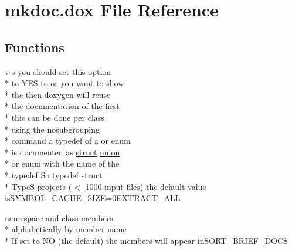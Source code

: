 \hypertarget{mkdoc_8dox}{\section{mkdoc.\-dox File Reference}
\label{mkdoc_8dox}
}
\subsection*{Functions}
\begin{DoxyCompactItemize}
\item 
v s you should set this option \\*
to Y\-E\-S to or you want to show \\*
the then doxygen will reuse \\*
the documentation of the first \\*
this can be done per class \\*
using the nosubgrouping \\*
command a typedef of a or enum \\*
is documented as \hyperlink{mkdoc_8dox_aba655c5729da86df745f0c8e7f9ba8d2}{struct} \hyperlink{mkdoc_8dox_a68000add3c95d09ceb97c3079515907d}{union} \\*
or enum with the name of the \\*
typedef So typedef \hyperlink{mkdoc_8dox_aba655c5729da86df745f0c8e7f9ba8d2}{struct} \\*
\hyperlink{mkdoc_8dox_a25dd1c015abaf1e4f2c6879012f4f170}{Type\-S} \hyperlink{mkdoc_8dox_a015310e1bd6d672828fcda81e432aa09}{projects} ($<$ 1000 input files) the default value is\-S\-Y\-M\-B\-O\-L\-\_\-\-C\-A\-C\-H\-E\-\_\-\-S\-I\-Z\-E=0\-E\-X\-T\-R\-A\-C\-T\-\_\-\-A\-L\-L
\item 
\hyperlink{mkdoc_8dox_a525af27f938795208a10ce5261c76978}{namespace} and class members \\*
alphabetically by member name \\*
If set to \hyperlink{mkdoc_8dox_a0f6a46245280dc38baf9600906aa1393}{N\-O} (the default) the members will appear in\-S\-O\-R\-T\-\_\-\-B\-R\-I\-E\-F\-\_\-\-D\-O\-C\-S
\end{DoxyCompactItemize}

